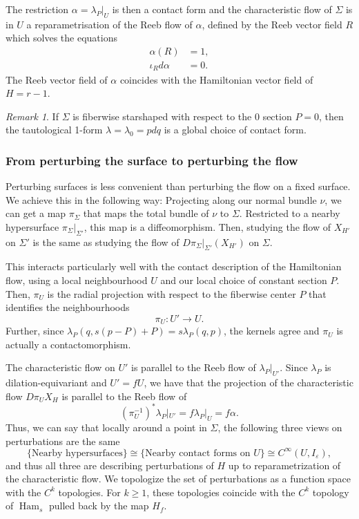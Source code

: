 \documentclass{amsart}
\newcommand{\Ham}{\operatorname{Ham}}
\theoremstyle{definition}
\theoremstyle{remark}
\newtheorem{remark}[proposition]{Remark}
\numberwithin{equation}{section}
\begin{document}
The restriction $\alpha=\lambda_P|_U$ is then a contact form and the characteristic flow of $\Sigma$ is in $U$ a reparametrisation of the Reeb flow of $\alpha$, defined by the Reeb vector field $R$ which solves the equations
\begin{align*}
    \alpha(R)&=1,\\
    \iota_Rd\alpha &=0.
\end{align*}
The Reeb vector field of $\alpha$ coincides with the Hamiltonian vector field of $H=r-1$.

\begin{remark}    
If $\Sigma$ is fiberwise starshaped with respect to the $0$ section $P=0$, then the tautological 1-form $\lambda=\lambda_0=pdq$ is a global choice of contact form. 
\end{remark}


\subsubsection{From perturbing the surface to perturbing the flow}

Perturbing surfaces is less convenient than perturbing the flow on a fixed surface. We achieve this in the following way: Projecting along our normal bundle $\nu$, we can get a map $\pi_\Sigma$ that maps the total bundle of $\nu$ to $\Sigma$. Restricted to a nearby hypersurface $\pi_\Sigma|_{\Sigma'}$, this map is a diffeomorphism. Then, studying the flow of $X_{H'}$ on $\Sigma'$ is the same as studying the flow of $D\pi_\Sigma|_{\Sigma'}(X_{H'})$ on $\Sigma$.

This interacts particularly well with the contact description of the Hamiltonian flow, using a local neighbourhood $U$ and our local choice of constant section $P$. Then, $\pi_U$ is the radial projection with respect to the fiberwise center $P$ that identifies the neighbourhoods
$$\pi_U:U'\to U.$$
Further, since $\lambda_P(q,s(p-P)+P) = s\lambda_P(q,p)$, the kernels agree and $\pi_U$ is actually a contactomorphism. 

The characteristic flow on $U'$ is parallel to the Reeb flow of $\lambda_P|_{U'}$. Since $\lambda_P$ is dilation-equivariant and ${U'}=fU$, we have that the projection of the characteristic flow $D\pi_U X_H$ is parallel to the Reeb flow of $$(\pi_U^{-1})^*\lambda_P|_{U'} = f\lambda_P|_U= f\alpha.$$ 
Thus, we can say that locally around a point in $\Sigma$, the following three views on perturbations are the same
$$\{\mbox{Nearby hypersurfaces}\}\cong\{\mbox{Nearby contact forms on }U\}\cong C^\infty(U,I_\varepsilon),$$
and thus all three are describing perturbations of $H$ up to reparametrization of the characteristic flow. We topologize the set of perturbations as a function space with the $C^k$ topologies. For $k\geq 1$, these topologies coincide with the $C^k$ topology of $\Ham_s$ pulled back by the map $H_f$. 
\end{document}
